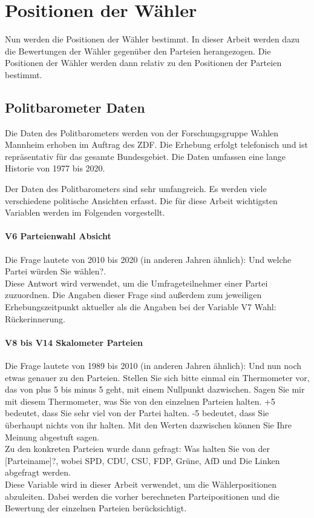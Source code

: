 \section{Positionen der Wähler}\label{Sec-Wählerpositionen}

Nun werden die Positionen der Wähler bestimmt. In dieser Arbeit werden dazu die Bewertungen der Wähler gegenüber den Parteien herangezogen. Die Positionen der Wähler werden dann relativ zu den Positionen der Parteien bestimmt.

\subsection{Politbarometer Daten}
Die Daten des Politbarometers \citep{politbarometer} werden von der Forschungsgruppe Wahlen Mannheim erhoben im Auftrag des ZDF. Die Erhebung erfolgt telefonisch und ist repräsentativ für das gesamte Bundesgebiet. Die Daten umfassen eine lange Historie von 1977 bis 2020.

Der Daten des Politbarometers sind sehr umfangreich. Es werden viele verschiedene politische Ansichten erfasst. Die für diese Arbeit wichtigsten Variablen werden im Folgenden vorgestellt.

\paragraph{V6 Parteienwahl Absicht}
Die Frage lautete von 2010 bis 2020 (in anderen Jahren ähnlich): \glqq Und welche Partei würden Sie wählen?\grqq. \citep[Variablendokumentation, S.\,12]{politbarometer}\\
Diese Antwort wird verwendet, um die Umfrageteilnehmer einer Partei zuzuordnen. Die Angaben dieser Frage sind außerdem zum jeweiligen Erhebungszeitpunkt aktueller als die Angaben bei der Variable \glqq V7 Wahl: Rückerinnerung\grqq.

\paragraph{V8 bis V14 Skalometer Parteien}
Die Frage lautete von 1989 bis 2010 (in anderen Jahren ähnlich): \glqq Und nun noch etwas genauer zu den Parteien. Stellen Sie sich bitte einmal ein Thermometer vor, das von plus 5 bis minus 5 geht, mit einem Nullpunkt dazwischen. Sagen Sie mir mit diesem Thermometer, was Sie von den einzelnen Parteien halten. +5 bedeutet, dass Sie sehr viel von der Partei halten. -5 bedeutet, dass Sie überhaupt nichts von ihr halten. Mit den Werten dazwischen können Sie Ihre Meinung abgestuft sagen.\grqq\\
Zu den konkreten Parteien wurde dann gefragt: \glqq Was halten Sie von der [Parteiname]?\grqq, wobei SPD, CDU, CSU, FDP, Grüne, AfD und Die Linken abgefragt werden. \citep[Variablendokumentation, S.\,28-29]{politbarometer}\\
Diese Variable wird in dieser Arbeit verwendet, um die Wählerpositionen abzuleiten. Dabei werden die vorher berechneten Parteipositionen und die Bewertung der einzelnen Parteien berücksichtigt.

